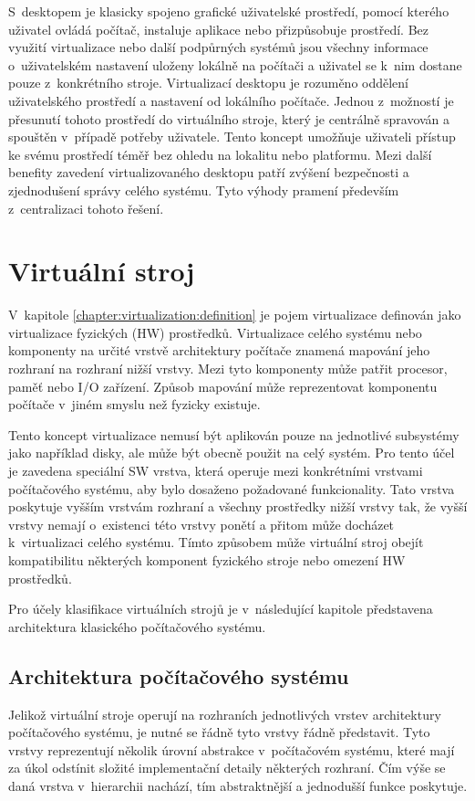 S~desktopem je klasicky spojeno grafické uživatelské prostředí, pomocí kterého uživatel ovládá počítač, instaluje aplikace
nebo přizpůsobuje prostředí. Bez využití virtualizace nebo další podpůrných systémů jsou všechny informace o~uživatelském
nastavení uloženy lokálně na počítači a uživatel se k~nim dostane pouze z~konkrétního stroje. Virtualizací desktopu je rozuměno
oddělení uživatelského prostředí a nastavení od lokálního počítače. Jednou z~možností je přesunutí tohoto prostředí do virtuálního
stroje, který je centrálně spravován a spouštěn v~případě potřeby uživatele. Tento koncept umožňuje uživateli přístup ke svému
prostředí téměř bez ohledu na lokalitu nebo platformu. Mezi další benefity zavedení virtualizovaného desktopu patří zvýšení
bezpečnosti a zjednodušení správy celého systému. Tyto výhody pramení především z~centralizaci tohoto řešení.  
\section{Virtuální stroj}
\label{chapter:virtualization:virtual_machine}
V~kapitole \ref{chapter:virtualization:definition} je pojem virtualizace definován jako virtualizace fyzických (HW) prostředků.
Virtualizace celého systému nebo komponenty na určité vrstvě architektury počítače znamená mapování jeho rozhraní na rozhraní
nižší vrstvy. Mezi tyto komponenty může patřit procesor, paměť nebo I/O zařízení. Způsob mapování může reprezentovat komponentu
počítače v~jiném smyslu než fyzicky existuje.

Tento koncept virtualizace nemusí být aplikován pouze na jednotlivé subsystémy jako například disky, ale může být obecně 
použit na celý systém. Pro tento účel je zavedena speciální SW vrstva, která operuje mezi konkrétními vrstvami počítačového
systému, aby bylo dosaženo požadované funkcionality. Tato vrstva poskytuje vyšším vrstvám rozhraní a všechny prostředky nižší
vrstvy tak, že vyšší vrstvy nemají o~existenci této vrstvy ponětí a přitom může docházet k~virtualizaci celého systému. Tímto
způsobem může virtuální stroj obejít kompatibilitu některých komponent fyzického stroje nebo omezení HW prostředků.

Pro účely klasifikace virtuálních strojů je v~následující kapitole představena architektura klasického počítačového systému.
\subsection{Architektura počítačového systému}
\label{chapter:virtualization:virtual_machine:computer_architecture}
Jelikož virtuální stroje operují na rozhraních jednotlivých vrstev architektury počítačového systému, je nutné se řádně tyto 
vrstvy řádně představit. Tyto vrstvy reprezentují několik úrovní abstrakce v~počítačovém systému, které mají za úkol odstínit
složité implementační detaily některých rozhraní. Čím výše se daná vrstva v~hierarchii nachází, tím abstraktnější a jednodušší
funkce poskytuje.

